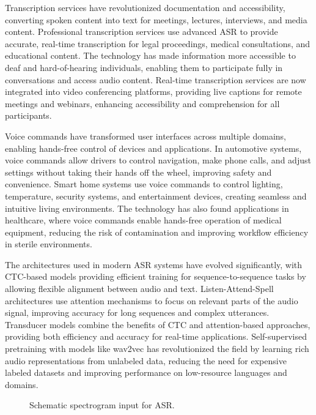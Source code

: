 Transcription services have revolutionized documentation and accessibility, converting spoken content into text for meetings, lectures, interviews, and media content. Professional transcription services use advanced ASR to provide accurate, real-time transcription for legal proceedings, medical consultations, and educational content. The technology has made information more accessible to deaf and hard-of-hearing individuals, enabling them to participate fully in conversations and access audio content. Real-time transcription services are now integrated into video conferencing platforms, providing live captions for remote meetings and webinars, enhancing accessibility and comprehension for all participants.

Voice commands have transformed user interfaces across multiple domains, enabling hands-free control of devices and applications. In automotive systems, voice commands allow drivers to control navigation, make phone calls, and adjust settings without taking their hands off the wheel, improving safety and convenience. Smart home systems use voice commands to control lighting, temperature, security systems, and entertainment devices, creating seamless and intuitive living environments. The technology has also found applications in healthcare, where voice commands enable hands-free operation of medical equipment, reducing the risk of contamination and improving workflow efficiency in sterile environments.

The architectures used in modern ASR systems have evolved significantly, with CTC-based models providing efficient training for sequence-to-sequence tasks by allowing flexible alignment between audio and text. Listen-Attend-Spell architectures use attention mechanisms to focus on relevant parts of the audio signal, improving accuracy for long sequences and complex utterances. Transducer models combine the benefits of CTC and attention-based approaches, providing both efficiency and accuracy for real-time applications. Self-supervised pretraining with models like wav2vec has revolutionized the field by learning rich audio representations from unlabeled data, reducing the need for expensive labeled datasets and improving performance on low-resource languages and domains.

\begin{figure}[h]
  \centering
  \caption{Schematic spectrogram input for ASR.}
  \label{fig:asr-spec}
\end{figure}

